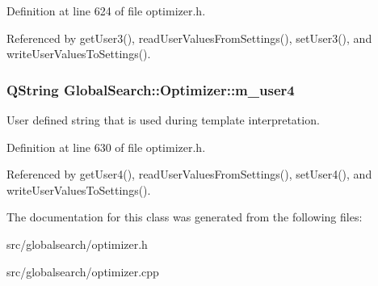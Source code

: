 Definition at line 624 of file optimizer.\+h.



Referenced by get\+User3(), read\+User\+Values\+From\+Settings(), set\+User3(), and write\+User\+Values\+To\+Settings().

\hypertarget{classGlobalSearch_1_1Optimizer_aefab51b84978d2fb49eaf3585894808a}{}
\subsubsection[{m\+\_\+user4}]{\setlength{\rightskip}{0pt plus 5cm}Q\+String Global\+Search\+::\+Optimizer\+::m\+\_\+user4\hspace{0.3cm}{\ttfamily [protected]}}\label{classGlobalSearch_1_1Optimizer_aefab51b84978d2fb49eaf3585894808a}
User defined string that is used during template interpretation. 

Definition at line 630 of file optimizer.\+h.



Referenced by get\+User4(), read\+User\+Values\+From\+Settings(), set\+User4(), and write\+User\+Values\+To\+Settings().



The documentation for this class was generated from the following files\+:\begin{DoxyCompactItemize}
\item 
src/globalsearch/optimizer.\+h\item 
src/globalsearch/optimizer.\+cpp\end{DoxyCompactItemize}

